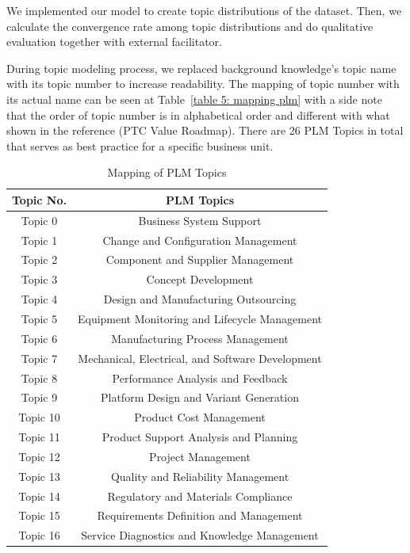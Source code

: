 \documentclass[senior]{IPSstyle}
\begin{document}
We implemented our model to create topic distributions of the dataset. Then, we calculate the convergence rate among topic distributions and do qualitative evaluation together with external facilitator.

During topic modeling process, we replaced background knowledge’s topic name with its topic number to increase readability. The mapping of topic number with its actual name can be seen at Table~\ref{table 5: mapping plm} with a side note that the order of topic number is in alphabetical order and different with what shown in the reference (PTC Value Roadmap). There are 26 PLM Topics in total that serves as best practice for a specific business unit.

\begin{longtable}{|c|c|}
\caption{Mapping of PLM Topics}\\
\hline
\textbf{Topic No.}&\textbf{PLM Topics}\\
\hline
Topic 0&Business System Support  \\
\hline
Topic 1&Change and Configuration Management \\
\hline
Topic 2&Component and Supplier Management \\
\hline
Topic 3&Concept Development \\
\hline
Topic 4&Design and Manufacturing Outsourcing \\
\hline
Topic 5&Equipment Monitoring and Lifecycle Management \\
\hline
Topic 6&Manufacturing Process Management \\
\hline
Topic 7&Mechanical, Electrical, and Software Development \\
\hline
Topic 8&Performance Analysis and Feedback \\
\hline
Topic 9&Platform Design and Variant Generation \\
\hline
Topic 10&Product Cost Management \\
\hline
Topic 11&Product Support Analysis and Planning \\
\hline
Topic 12&Project Management \\
\hline
Topic 13&Quality and Reliability Management \\
\hline
Topic 14&Regulatory and Materials Compliance \\
\hline
Topic 15&Requirements Definition and Management \\
\hline
Topic 16&Service Diagnostics and Knowledge Management \\

\end{longtable}
\end{document}
